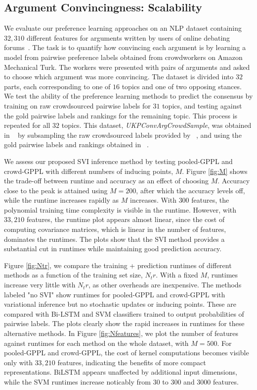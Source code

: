 \subsection{Argument Convincingness: Scalability}\label{sec:exp_scale}

We evaluate our preference learning approaches on an NLP dataset 
containing $32,310$ different features for arguments written by users
of online debating forums~\citet{habernal2016argument}.
The task is to quantify how convincing each argument is
by learning a model from pairwise preference labels obtained from crowdworkers
on Amazon Mechanical Turk. The workers were presented with pairs of arguments 
and asked to choose which argument was more convincing. 
The dataset is divided into $32$ parts, each corresponding to one of
$16$ topics and one of two opposing stances. 
We test the ability of the preference learning methods to predict the consensus
 by training on raw crowdsourced pairwise labels
for $31$ topics, and testing against the gold pairwise labels and rankings for the
remaining topic. This process is repeated for all $32$ topics.
This dataset, \emph{UKPConvArgCrowdSample}, was obtained in ~\citep{simpson2018finding}
by subsampling the raw crowdsourced labels provided by ~\citep{habernal2016argument},
and using the gold pairwise labels and rankings obtained in ~\citep{habernal2016argument}.

We assess our proposed SVI inference method by testing pooled-GPPL and crowd-GPPL with
different numbers of inducing points, $M$. Figure \ref{fig:M} shows the trade-off between
runtime and accuracy as an effect of choosing $M$. Accuracy close to the peak is attained
using $M=200$, after which the accuracy levels off, while the runtime increases rapidly
as $M$ increases.
With $300$ features, the polynomial training time complexity is visible in the runtime. 
However, with $33,210$ features, the runtime plot appears almost linear, since 
the cost of computing covariance matrices, which is linear in the number of features,
dominates the runtimes. The plots show that the SVI method provides a substantial cut
in runtimes while maintaining good prediction accuracy.

Figure \ref{fig:Ntr}, we compare the training + prediction runtimes of different methods as a
function of the training set size, $N_tr$. With a fixed $M$, runtimes increase very little 
with $N_tr$, as other overheads are inexpensive. The methods labeled "no SVI" show runtimes
for pooled-GPPL and crowd-GPPL with variational inference but no stochastic updates 
or inducing points. These are compared with Bi-LSTM and SVM classifiers trained to 
output probabilities of pairwise labels. The plots clearly show the rapid increases
in runtimes for these alternative methods. 
In Figure \ref{fig:Nfeatures}, we plot the number of features against runtimes for
each method on the whole dataset, with $M=500$. For pooled-GPPL and crowd-GPPL, 
the cost of kernel computations becomes visible only with $33,210$ features, 
indicating the benefits of more compact representations. BiLSTM appears unaffected by
additional input dimensions, while the SVM runtimes increase noticably from $30$ to $300$ and $3000$ features.


